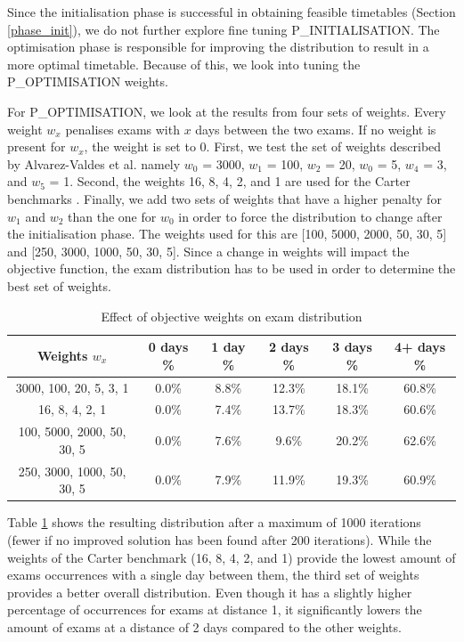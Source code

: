 Since the initialisation phase is successful in obtaining feasible timetables (Section \ref{phase_init}), we do not further explore fine tuning P\_INITIALISATION. The optimisation phase is responsible for improving the distribution to result in a more optimal timetable. Because of this, we look into tuning the P\_OPTIMISATION weights.

For P\_OPTIMISATION, we look at the results from four sets of weights. Every weight $w_x$ penalises exams with $x$ days between the two exams. If no weight is present for $w_x$, the weight is set to 0.  First, we test the set of weights described by Alvarez-Valdes et al. namely $w_0$ = 3000, $w_1$ = 100, $w_2$ = 20, $w_0$ = 5, $w_4$ = 3, and $w_5$ = 1. Second, the weights 16, 8, 4, 2, and 1 are used for the Carter benchmarks \cite{carter1996}. Finally, we add two sets of weights that have a higher penalty for $w_1$ and $w_2$ than the one for $w_0$ in order to force the distribution to change after the initialisation phase. The weights used for this are [100, 5000, 2000, 50, 30, 5] and [250, 3000, 1000, 50, 30, 5]. Since a change in weights will impact the objective function, the exam distribution has to be used in order to determine the best set of weights.

\begin{table}[h]
	\caption{Effect of objective weights on exam distribution}
	\label{tab:weights_distr}
	\centering
	\begin{tabular}{c c c c c c}
		\hline
  	\textbf{Weights $w_x$}	&
   \textbf{0 days \% } &
    \textbf{1 day \% } & 
    \textbf{2 days \% } &
    \textbf{3 days \% } & 
    \textbf{4+ days \%}\\ \hline
    3000, 100, 20, 5, 3, 1 & 0.0\% &  8.8\% & 12.3\% & 18.1\% & 60.8\% \\
    16, 8, 4, 2, 1 & 0.0\% & 7.4\% & 13.7\% & 18.3\% & 60.6\% \\
    100, 5000, 2000, 50, 30, 5 & 0.0\% & 7.6\% & 9.6\% & 20.2\% & 62.6\% \\
    250, 3000, 1000, 50, 30, 5 & 0.0\% &  7.9\% & 11.9\% & 19.3\% & 60.9\% \\
        \hline%
	\end{tabular}
\end{table}

Table \ref{tab:weights_distr} shows the resulting distribution after a maximum of 1000 iterations (fewer if no improved solution has been found after 200 iterations). While the weights of the Carter benchmark (16, 8, 4, 2, and 1) provide the lowest amount of exams occurrences with a single day between them, the third set of weights provides a better overall distribution. Even though it has a slightly higher percentage of occurrences for exams at distance 1, it significantly lowers the amount of exams at a distance of 2 days compared to the other weights.


